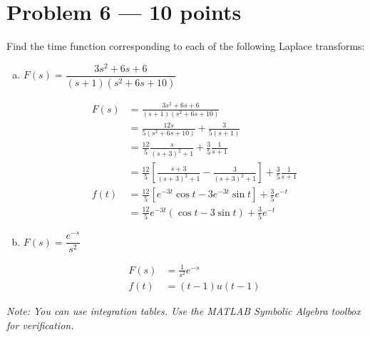 \documentclass[12pt]{article}
\begin{document}
\section*{Problem 6 --- 10 points}
    Find the time function corresponding to each of the following Laplace transforms:
    \begin{enumerate}[a.]
        \item $F(s) = \dfrac{3s^2 + 6s + 6}{(s+1)(s^2+6s+10)}$
        
        \color{darkblue}
            \begin{align*}
                F(s) &= \frac{3s^2 + 6s + 6}{(s+1)(s^2+6s+10)}\\ 
                &= \frac{12s}{5(s^2 + 6s + 10)} + \frac{3}{5(s + 1)}\\
                &= \frac{12}{5} \frac{s}{(s+3)^2 + 1} + \frac{3}{5} \frac{1}{s + 1}\\
                &= \frac{12}{5} \left[\frac{s + 3}{(s+3)^2 + 1} - \frac{3}{(s+3)^2 + 1}\right] + \frac{3}{5} \frac{1}{s + 1}\\
                f(t) &= \frac{12}{5} \left[e^{-3t} \cos t - 3e^{-3t} \sin t\right] + \frac{3}{5} e^{-t}\\ 
                &= \boxed{\frac{12}{5}e^{-3t} \left(\cos t - 3\sin t\right) + \frac{3}{5} e^{-t}}
            \end{align*}
        \color{black}

        \item $F(s) = \dfrac{e^{-s}}{s^2}$
        
        \color{darkblue}
            \begin{align*}
                F(s) &= \frac{1}{s^2} e^{-s}\\ 
                f(t) &= \boxed{(t - 1)u(t-1)}
            \end{align*}
        \color{black}

    \end{enumerate}
    \textit{Note: You can use integration tables. Use the MATLAB Symbolic Algebra toolbox for verification.}
\end{document}
